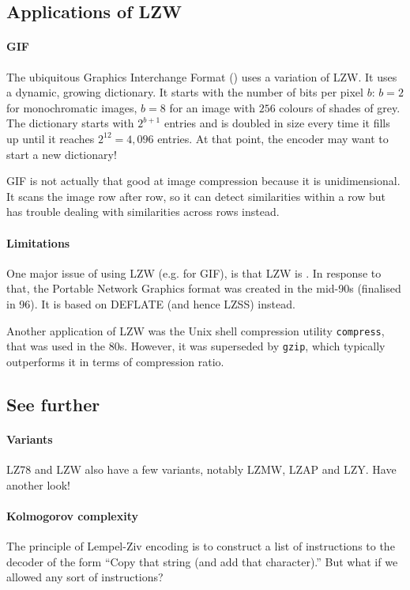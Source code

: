 \subsection{Applications of LZW}

\paragraph{GIF} The ubiquitous Graphics Interchange Format () uses a variation of LZW. It uses a dynamic, growing dictionary. It starts with the number of bits per pixel $b$: $b=2$ for monochromatic images, $b=8$ for an image with $256$ colours of shades of grey. The dictionary starts with $2^{b+1}$ entries and is doubled in size every time it fills up until it reaches $2^{12} = 4,096$ entries. At that point, the encoder may want to start a new dictionary!

GIF is not actually that good at image compression because it is unidimensional. It scans the image row after row, so it can detect similarities within a row but has trouble dealing with similarities across rows instead.

\paragraph{Limitations} One major issue of using LZW (e.g. for GIF), is that LZW is . In response to that, the Portable Network Graphics format was created in the mid-90s (finalised in 96). It is based on DEFLATE (and hence LZSS) instead.

Another application of LZW was the Unix shell compression utility \texttt{compress}, that was used in the 80s. However, it was superseded by \texttt{gzip}, which typically outperforms it in terms of compression ratio.

\subsection{See further}

\paragraph{Variants} LZ78 and LZW also have a few variants, notably LZMW, LZAP and LZY. Have another look!

\paragraph{Kolmogorov complexity} The principle of Lempel-Ziv encoding is to construct a list of instructions to the decoder of the form ``Copy that string (and add that character).'' But what if we allowed any sort of instructions?

